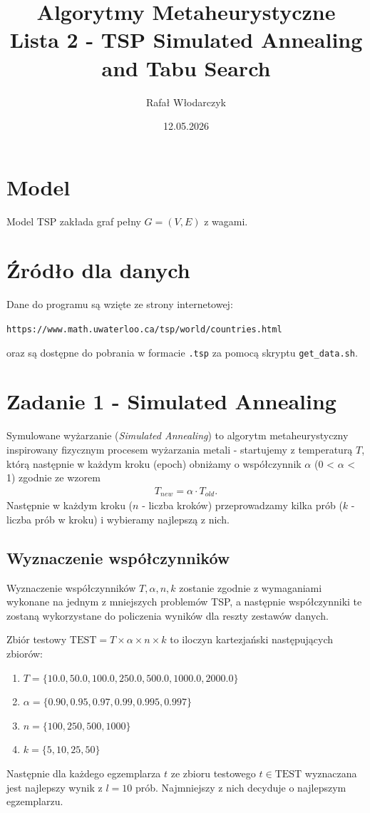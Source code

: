 \documentclass{article}
\title{Algorytmy Metaheurystyczne\\Lista 2 - TSP Simulated Annealing and Tabu Search}
\author{Rafał Włodarczyk}
\date{12.05.2026}
\begin{document}
\maketitle

\tableofcontents

\section{Model}

Model TSP zakłada graf pełny $G=(V,E)$ z wagami.

\section{Źródło dla danych}

Dane do programu są wzięte ze strony internetowej:
\begin{center}
\texttt{https://www.math.uwaterloo.ca/tsp/world/countries.html}
\end{center}
oraz są dostępne do pobrania w formacie \texttt{.tsp} za pomocą skryptu \texttt{get\_data.sh}.

\section{Zadanie 1 - Simulated Annealing}

Symulowane wyżarzanie (\textit{Simulated Annealing}) to algorytm metaheurystyczny inspirowany
fizycznym procesem wyżarzania metali - startujemy z temperaturą $T$, którą następnie w każdym
kroku (epoch) obniżamy o współczynnik $\alpha$ (0 < $\alpha$ < 1) zgodnie ze wzorem
\begin{align*}
    T_{new} = \alpha \cdot T_{old}.
\end{align*}
Następnie w każdym kroku ($n$ - liczba kroków)
przeprowadzamy kilka prób ($k$ - liczba prób w kroku) i wybieramy 
najlepszą z nich.

\subsection{Wyznaczenie współczynników}
Wyznaczenie współczynników $T, \alpha, n, k$ zostanie zgodnie z wymaganiami
wykonane na jednym z mniejszych problemów TSP, a następnie współczynniki te zostaną wykorzystane 
do policzenia wyników dla reszty zestawów danych.

\noindent
Zbiór testowy $\text{TEST}=T\times \alpha \times n \times k$ to iloczyn kartezjański następujących zbiorów:
\begin{enumerate}
    \item $T=\{10.0, 50.0, 100.0, 250.0, 500.0, 1000.0, 2000.0\}$
    \item $\alpha=\{0.90, 0.95, 0.97, 0.99, 0.995, 0.997\}$
    \item $n=\{100, 250, 500, 1000\}$
    \item $k=\{5, 10, 25, 50\}$
\end{enumerate}
Następnie dla każdego egzemplarza $t$ ze zbioru testowego $t\in\text{TEST}$ wyznaczana jest najlepszy wynik
z $l=10$ prób. Najmniejszy z nich decyduje o najlepszym egzemplarzu.
\end{document}
